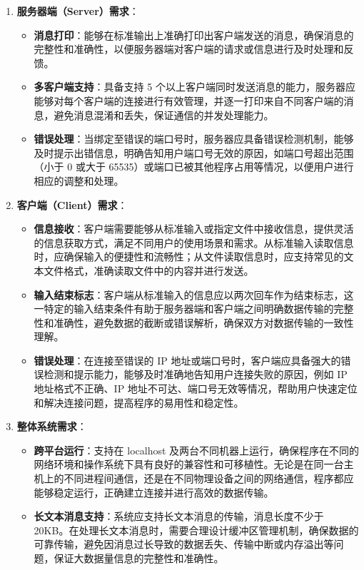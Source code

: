 \documentclass{article}
\begin{document}
\begin{enumerate}
	\item \textbf{服务器端（Server）需求}：
	\begin{itemize}
		\item \textbf{消息打印}：能够在标准输出上准确打印出客户端发送的消息，确保消息的完整性和准确性，以便服务器端对客户端的请求或信息进行及时处理和反馈。
		\item \textbf{多客户端支持}：具备支持 5 个以上客户端同时发送消息的能力，服务器应能够对每个客户端的连接进行有效管理，并逐一打印来自不同客户端的消息，避免消息混淆和丢失，保证通信的并发处理能力。
		\item \textbf{错误处理}：当绑定至错误的端口号时，服务器应具备错误检测机制，能够及时提示出错信息，明确告知用户端口号无效的原因，如端口号超出范围（小于 0 或大于 65535）或端口已被其他程序占用等情况，以便用户进行相应的调整和处理。
	\end{itemize}
	\item \textbf{客户端（Client）需求}：
	\begin{itemize}
		\item \textbf{信息接收}：客户端需要能够从标准输入或指定文件中接收信息，提供灵活的信息获取方式，满足不同用户的使用场景和需求。从标准输入读取信息时，应确保输入的便捷性和流畅性；从文件读取信息时，应支持常见的文本文件格式，准确读取文件中的内容并进行发送。
		\item \textbf{输入结束标志}：客户端从标准输入的信息应以两次回车作为结束标志，这一特定的输入结束条件有助于服务器端和客户端之间明确数据传输的完整性和准确性，避免数据的截断或错误解析，确保双方对数据传输的一致性理解。
		\item \textbf{错误处理}：在连接至错误的 IP 地址或端口号时，客户端应具备强大的错误检测和提示能力，能够及时准确地告知用户连接失败的原因，例如 IP 地址格式不正确、IP 地址不可达、端口号无效等情况，帮助用户快速定位和解决连接问题，提高程序的易用性和稳定性。
	\end{itemize}
	\item \textbf{整体系统需求}：
	\begin{itemize}
		\item \textbf{跨平台运行}：支持在 localhost 及两台不同机器上运行，确保程序在不同的网络环境和操作系统下具有良好的兼容性和可移植性。无论是在同一台主机上的不同进程间通信，还是在不同物理设备之间的网络通信，程序都应能够稳定运行，正确建立连接并进行高效的数据传输。
		\item \textbf{长文本消息支持}：系统应支持长文本消息的传输，消息长度不少于 20KB。在处理长文本消息时，需要合理设计缓冲区管理机制，确保数据的可靠传输，避免因消息过长导致的数据丢失、传输中断或内存溢出等问题，保证大数据量信息的完整性和准确性。

\end{itemize}
\end{enumerate}
\end{document}
